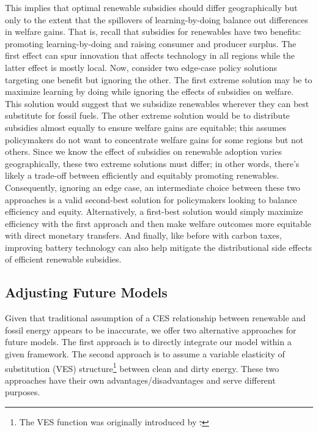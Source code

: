 \documentclass[11pt,a4paper,leqno]{extarticle}
\providecommand{\DIFadd}[1]{{\protect\color{blue}\uwave{#1}}} %
\providecommand{\DIFdel}[1]{{\protect\color{red}\sout{#1}}}                      %
\providecommand{\DIFaddbegin}{} %
\providecommand{\DIFaddend}{} %
\providecommand{\DIFdelbegin}{} %
\providecommand{\DIFdelend}{} %
\begin{document}
	This implies that optimal renewable subsidies should differ geographically but only to the extent that the spillovers of learning-by-doing balance out differences in welfare gains. That is, recall that subsidies for renewables have two benefits: promoting learning-by-doing and raising consumer and producer surplus. The first effect  can spur innovation that affects technology in all regions while the latter effect is mostly local. Now, consider two edge-case policy solutions targeting one benefit but ignoring the other. The first extreme solution may be to maximize learning by doing while ignoring the effects of subsidies on welfare. This solution would suggest that we subsidize renewables wherever they can best substitute for fossil fuels. The other extreme solution would be to distribute subsidies almost equally to ensure welfare gains are equitable; this assumes policymakers do not want to concentrate welfare gains for some regions but not others. Since we know the effect of subsidies on renewable adoption varies geographically, these two extreme solutions must differ; in other words, there's likely a trade-off between efficiently and equitably promoting renewables. Consequently, ignoring an edge case, an intermediate choice between these two approaches is a valid second-best solution for policymakers looking to balance efficiency and equity. Alternatively, a first-best solution would simply maximize efficiency with the first approach and then make welfare outcomes more equitable with direct monetary transfers. And finally, like before with carbon taxes, improving battery technology can also help mitigate the distributional side effects of efficient renewable subsidies. 
	
	\subsection{Adjusting Future Models}
	
	Given that traditional assumption of a CES relationship between renewable and fossil energy appears to be inaccurate, we offer two alternative approaches for future models. The first approach is to directly integrate our model within a given framework. The second approach is to assume a variable elasticity of substitution (VES) structure\footnote{ The VES function was originally introduced by \citet{VES}\DIFdelbegin \DIFdel{.}\DIFdelend \DIFaddbegin \DIFadd{; we detail its structure in  }\DIFaddend } between clean and dirty energy. These two approaches have their own advantages/disadvantages and serve different purposes. 
	
\end{document}
